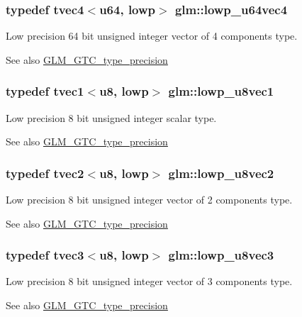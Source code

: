 \subsubsection[{lowp\+\_\+u64vec4}]{\setlength{\rightskip}{0pt plus 5cm}typedef tvec4$<${\bf u64}, lowp$>$ {\bf glm\+::lowp\+\_\+u64vec4}}\label{namespaceglm_a065789a607d0dedd298461844a57949a}
Low precision 64 bit unsigned integer vector of 4 components type. \begin{DoxySeeAlso}{See also}
\hyperlink{group__gtc__type__precision}{G\+L\+M\+\_\+\+G\+T\+C\+\_\+type\+\_\+precision} 
\end{DoxySeeAlso}
\hypertarget{namespaceglm_a4d00e78f5355c1448fa1df91316921e7}{}
\subsubsection[{lowp\+\_\+u8vec1}]{\setlength{\rightskip}{0pt plus 5cm}typedef tvec1$<${\bf u8}, lowp$>$ {\bf glm\+::lowp\+\_\+u8vec1}}\label{namespaceglm_a4d00e78f5355c1448fa1df91316921e7}
Low precision 8 bit unsigned integer scalar type. \begin{DoxySeeAlso}{See also}
\hyperlink{group__gtc__type__precision}{G\+L\+M\+\_\+\+G\+T\+C\+\_\+type\+\_\+precision} 
\end{DoxySeeAlso}
\hypertarget{namespaceglm_ad36641fb792346ac7ca4d78b57939371}{}
\subsubsection[{lowp\+\_\+u8vec2}]{\setlength{\rightskip}{0pt plus 5cm}typedef tvec2$<${\bf u8}, lowp$>$ {\bf glm\+::lowp\+\_\+u8vec2}}\label{namespaceglm_ad36641fb792346ac7ca4d78b57939371}
Low precision 8 bit unsigned integer vector of 2 components type. \begin{DoxySeeAlso}{See also}
\hyperlink{group__gtc__type__precision}{G\+L\+M\+\_\+\+G\+T\+C\+\_\+type\+\_\+precision} 
\end{DoxySeeAlso}
\hypertarget{namespaceglm_aad3c30445b2325a2e864c90a732c017a}{}
\subsubsection[{lowp\+\_\+u8vec3}]{\setlength{\rightskip}{0pt plus 5cm}typedef tvec3$<${\bf u8}, lowp$>$ {\bf glm\+::lowp\+\_\+u8vec3}}\label{namespaceglm_aad3c30445b2325a2e864c90a732c017a}
Low precision 8 bit unsigned integer vector of 3 components type. \begin{DoxySeeAlso}{See also}
\hyperlink{group__gtc__type__precision}{G\+L\+M\+\_\+\+G\+T\+C\+\_\+type\+\_\+precision} 
\end{DoxySeeAlso}
\hypertarget{namespaceglm_a92e38081e667dd04e6a95817e9c4885e}{}
